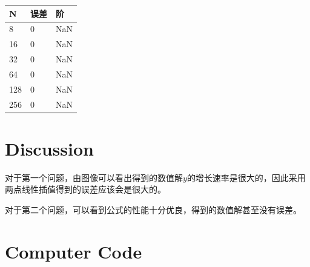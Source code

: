 \documentclass{article}
\begin{document}
	\begin{table}[H]
		\centering
		\begin{tabular}{|l|l|l|}
			\hline
			N & 误差 & 阶 \\ \hline
			8 & 0 & NaN \\ \hline
			16 & 0 & NaN \\ \hline
			32 & 0 & NaN \\ \hline
			64 & 0 & NaN \\ \hline
			128 & 0 & NaN \\ \hline
			256 & 0 & NaN \\ \hline
		\end{tabular}
	\end{table}
	
	
	
	\section{Discussion}
	对于第一个问题，由图像可以看出得到的数值解$y$的增长速率是很大的，因此采用两点线性插值得到的误差应该会是很大的。
	
	对于第二个问题，可以看到公式的性能十分优良，得到的数值解甚至没有误差。


	\section{Computer Code}
	
	    
	    
	    
	    
\end{document}
